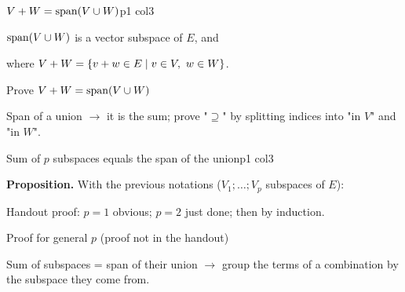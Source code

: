 \documentclass[sheet,noautoquant,noautokw]{neyvia-study}
\begin{document}
\begin{concept}[1.22]{$V+W=\operatorname{span}(V\cup W)$}{p1 col3}
\begin{definition}
\noindent $\operatorname{span}(V\cup W)$ is a vector subspace of $E$, and
\par\noindent where $V+W=\left\{v+w\in E\mid v\in V,\ w\in W\right\}$.
\end{definition}
\begin{method}{Prove $V+W=\operatorname{span}(V\cup W)$}
\end{method}
\begin{reflex}
Span of a union \ensuremath{\rightarrow} it is the sum; prove "$\supseteq$" by splitting indices into "in $V$" and "in $W$".
\end{reflex}
\end{concept}
\begin{concept}[1.23]{Sum of $p$ subspaces equals the span of the union}{p1 col3}
\begin{definition}
\noindent \textbf{Proposition.} With the previous notations ($V_1;\dots;V_p$ subspaces of $E$):
\par\noindent Handout proof: $p=1$ obvious; $p=2$ just done; then by induction.
\end{definition}
\begin{method}{Proof for general $p$ (proof not in the handout)}
\end{method}
\begin{reflex}
Sum of subspaces = span of their union \ensuremath{\rightarrow} group the terms of a combination by the subspace they come from.
\end{reflex}
\end{concept}
\end{document}
